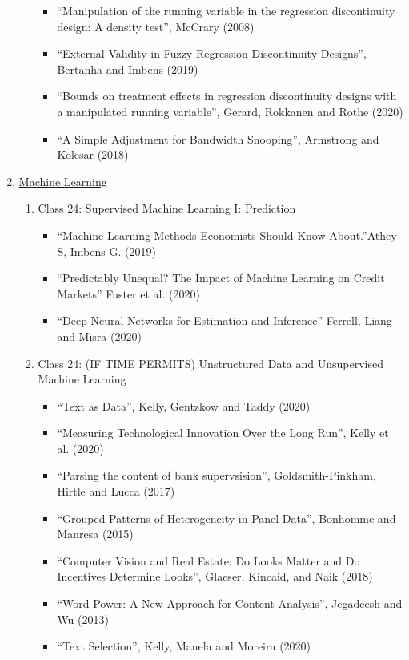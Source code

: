 \documentclass[11pt, a4paper]{article}
\begin{document}
\begin{enumerate}
\begin{enumerate}
\begin{itemize}
    \item ``Manipulation of the running variable in the regression discontinuity design: A density test'', McCrary (2008)
    \item ``External Validity in Fuzzy Regression Discontinuity Designs'', Bertanha and Imbens (2019)
    \item ``Bounds on treatment effects in regression discontinuity designs with a manipulated running variable'', Gerard, Rokkanen and Rothe (2020)
    \item ``A Simple Adjustment for Bandwidth Snooping'', Armstrong and Kolesar (2018)
    \end{itemize}     
  \end{enumerate}
\item \underline{Machine Learning}
  \begin{enumerate}
  \item Class 24: Supervised Machine Learning I: Prediction
    \begin{itemize}
    \item ``Machine Learning Methods Economists Should Know About.''Athey S, Imbens G.  (2019)
    \item ``Predictably Unequal? The Impact of Machine Learning on Credit Markets'' Fuster et al. (2020)
    \item ``Deep Neural Networks for Estimation and Inference'' Ferrell, Liang and Misra (2020)
    \end{itemize}
  \item Class 24: (IF TIME PERMITS) Unstructured Data and Unsupervised Machine Learning 
    \begin{itemize}
    \item ``Text as Data'', Kelly, Gentzkow and Taddy (2020)
    \item ``Measuring Technological Innovation Over the Long Run'', Kelly et al. (2020)
    \item ``Parsing the content of bank supervsision'', Goldsmith-Pinkham, Hirtle and Lucca (2017)
    \item ``Grouped Patterns of Heterogeneity in Panel Data'', Bonhomme and Manresa (2015)
    \item ``Computer Vision and Real Estate: Do Looks Matter and Do Incentives Determine Looks'', Glaeser, Kincaid, and Naik (2018)
    \item ``Word Power: A New Approach for Content Analysis'', Jegadeesh and Wu (2013)
    \item ``Text Selection'', Kelly, Manela and Moreira (2020)

\end{itemize}
\end{enumerate}
\end{enumerate}
\end{document}
